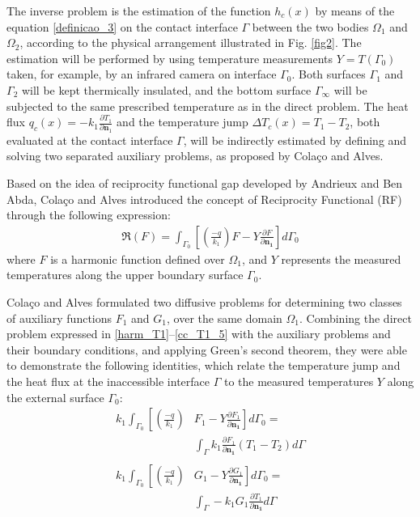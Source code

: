 \documentclass[conference,compsoc,fleqn]{IEEEtran}
\begin{document}
The inverse problem is the estimation of the function $h_c(x)$ by means of the equation \eqref{definicao_3} on the contact interface $\Gamma$ between the two bodies $\Omega_1$ and $\Omega_2$, according to the physical arrangement illustrated in Fig. \ref{fig2}. The estimation will be performed by using temperature measurements $Y = T(\Gamma_0)$ taken, for example, by an infrared camera on interface $\Gamma_0$. Both surfaces $\Gamma_1$ and $\Gamma_2$ will be kept thermically insulated, and the bottom surface $\Gamma_\infty$ will be subjected to the same prescribed temperature as in the direct problem. The heat flux $q_c(x) = -k_1\frac{\partial T_1}{\partial \mathbf{n}_1}$ and the temperature jump $\Delta T_c(x) = T_1 - T_2$, both evaluated at the contact interface $\Gamma$, will be indirectly estimated by defining and solving two separated auxiliary problems, as proposed by Colaço and Alves\cite{reciproc_3}.
\\


Based on the idea of reciprocity functional gap developed by Andrieux and Ben Abda\cite{artigo_andrieux}, Colaço and Alves\cite{reciproc_3} introduced the concept of Reciprocity Functional (RF) through the following expression:
\begin{align}
	\Re(F) = \int_{\Gamma_0}\left[\left(\frac{-q}{k_1}\right)F - Y\frac{\partial F}{\partial\mathbf{n_1}}\right]d\Gamma_0
	\label{def_funcional_reciprocidade}
\end{align}
where $F$ is a harmonic function defined over $\Omega_1$, and $Y$ represents the measured temperatures along the upper boundary surface $\Gamma_0$.

Colaço and Alves\cite{reciproc_3} formulated two diffusive problems for determining two classes of auxiliary functions $F_1$ and $G_1$, over the same domain $\Omega_1$. Combining the direct problem expressed in \eqref{harm_T1}--\eqref{cc_T1_5} with the auxiliary problems and their boundary conditions, and applying Green's second theorem, they were able to demonstrate the following identities, which relate the temperature jump and the heat flux at the inaccessible interface $\Gamma$ to the measured temperatures $Y$ along the external surface $\Gamma_0$:
\begin{align}
	k_1\int_{\Gamma_0}\left[\left(\frac{-q}{k_1}\right)\right. & \left.F_1 - Y\frac{\partial F_1}{\partial\mathbf{n_1}}\right]d\Gamma_0
	= \nonumber \\
	& \int_\Gamma k_1 \frac{\partial F_1}{\partial\mathbf{n_1}}\left(T_1 - T_2\right)d\Gamma
	\label{identidade_T} \\ \nonumber \\
	k_1\int_{\Gamma_0}\left[\left(\frac{-q}{k_1}\right)\right. & \left.G_1 -  Y\frac{\partial G_1}{\partial\mathbf{n_1}}\right]d\Gamma_0
	= \nonumber \\
	& \int_\Gamma -k_1 G_1 \frac{\partial T_1}{\partial\mathbf{n_1}}d\Gamma
	\label{identidade_q}
\end{align}
\end{document}
